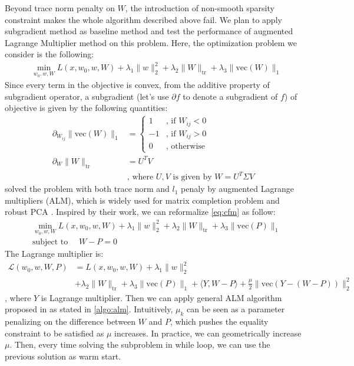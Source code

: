 \documentclass{article}
\newcommand{\tr}{\text{tr}}
\newcommand{\vecc}{\text{vec}}
\begin{document}
Beyond trace norm penalty on $W$, the introduction of non-smooth sparsity constraint makes the whole algorithm described above fail. We plan to apply subgradient method as baseline method and test the performance of augmented Lagrange Multiplier method on this problem. Here, the optimization problem we consider is the following:
\begin{align}
  &\min_{w_0, w, W} L(x, w_0, w, W) + \lambda_1 \|w\|_2^2 + \lambda_2 \|W\|_{\tr} + \lambda_3 \|\vecc(W)\|_1 \label{eq:cfm}
\end{align}
Since every term in the objective is convex, from the additive property of subgradient operator, a subgradient (let’s use $\partial f$ to denote a subgradient of $f$) of objective is given by the following quantities:
\begin{align}
  \partial_{W_{ij}} \|\vecc(W)\|_1 &= \begin{cases}
    1 & \text{, if $W_{ij} < 0$} \nonumber \\
    -1 & \text{, if $W_{ij} > 0$} \nonumber \\
    0 & \text{, otherwise} 
\end{cases} \\
  \partial_{W} \|W\|_{\tr} &= U^TV \nonumber \\
  & \text{, where $U, V$ is given by $W = U^T \Sigma V$} \nonumber
\end{align}
\cite{li2015conformal} solved the problem with both trace norm and $l_1$ penaly by augmented Lagrange multipliers (ALM), which is widely used for matrix completion problem and robust PCA \cite{lin2010augmented}. Inspired by their work, we can reformalize \cref{eq:cfm} as follow:
\begin{align}
  &\min_{w_0, w, W} L(x, w_0, w, W) + \lambda_1 \|w\|_2^2 + \lambda_2 \|W\|_{\tr} + \lambda_3 \|\vecc(P)\|_1 \label{eq:cfm_alm} \\
  & \text{subject to }\quad W - P = 0
\end{align}
The Lagrange multiplier is:
\begin{align}
  \mathcal{L}(w_0, w, W, P) &= L(x, w_0, w, W) + \lambda_1 \|w\|_2^2 \nonumber \\
  &+ \lambda_2 \|W\|_{\tr} + \lambda_3 \|\vecc(P)\|_1 + \langle Y, W - P \rangle + \frac{\mu}{2} \|\vecc(Y - (W - P))\|_2^2 \label{eq:alm}
\end{align}
, where $Y$ is Lagrange multiplier. Then we can apply general ALM algorithm proposed in \cite{lin2010augmented} as stated in \cref{algo:alm}. Intuitively, $\mu_k$ can be seen as a parameter penalizing on the difference between $W$ and $P$, which pushes the equality constraint to be satisfied as $\mu$ increases. In practice, we can geometrically increase $\mu$. Then, every time solving the subproblem in while loop, we can use the previous solution as warm start. 
\end{document}
